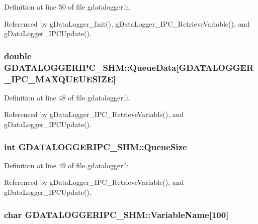 Definition at line 50 of file gdatalogger.\-h.



Referenced by g\-Data\-Logger\-\_\-\-Init(), g\-Data\-Logger\-\_\-\-I\-P\-C\-\_\-\-Retrieve\-Variable(), and g\-Data\-Logger\-\_\-\-I\-P\-C\-Update().

\hypertarget{structGDATALOGGERIPC__SHM_ac495752de142e6697c08f713505ed55c}{
\subsubsection[{Queue\-Data}]{\setlength{\rightskip}{0pt plus 5cm}double G\-D\-A\-T\-A\-L\-O\-G\-G\-E\-R\-I\-P\-C\-\_\-\-S\-H\-M\-::\-Queue\-Data\mbox{[}{\bf G\-D\-A\-T\-A\-L\-O\-G\-G\-E\-R\-\_\-\-I\-P\-C\-\_\-\-M\-A\-X\-Q\-U\-E\-U\-E\-S\-I\-Z\-E}\mbox{]}}}\label{structGDATALOGGERIPC__SHM_ac495752de142e6697c08f713505ed55c}


Definition at line 48 of file gdatalogger.\-h.



Referenced by g\-Data\-Logger\-\_\-\-I\-P\-C\-\_\-\-Retrieve\-Variable(), and g\-Data\-Logger\-\_\-\-I\-P\-C\-Update().

\hypertarget{structGDATALOGGERIPC__SHM_a7d392777d231e1b0cece66cb51b0945b}{
\subsubsection[{Queue\-Size}]{\setlength{\rightskip}{0pt plus 5cm}int G\-D\-A\-T\-A\-L\-O\-G\-G\-E\-R\-I\-P\-C\-\_\-\-S\-H\-M\-::\-Queue\-Size}}\label{structGDATALOGGERIPC__SHM_a7d392777d231e1b0cece66cb51b0945b}


Definition at line 49 of file gdatalogger.\-h.



Referenced by g\-Data\-Logger\-\_\-\-I\-P\-C\-\_\-\-Retrieve\-Variable(), and g\-Data\-Logger\-\_\-\-I\-P\-C\-Update().

\hypertarget{structGDATALOGGERIPC__SHM_afb130e15f688a18e52e2037f4bb17e89}{
\subsubsection[{Variable\-Name}]{\setlength{\rightskip}{0pt plus 5cm}char G\-D\-A\-T\-A\-L\-O\-G\-G\-E\-R\-I\-P\-C\-\_\-\-S\-H\-M\-::\-Variable\-Name\mbox{[}100\mbox{]}}}\label{structGDATALOGGERIPC__SHM_afb130e15f688a18e52e2037f4bb17e89}


